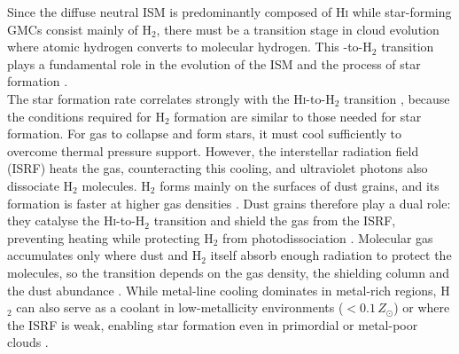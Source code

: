 Since the diffuse neutral ISM is predominantly composed of \textrm{H\textsc{i}} while star-forming GMCs consist mainly of H$_2$, there must be a transition stage in cloud evolution where atomic hydrogen converts to molecular hydrogen. This \HI-to-H$_2$ transition plays a fundamental role in the evolution of the ISM and the process of star formation \citep{Lee2012, Sternberg2014, Klessen2016}.\\\indent
The star formation rate correlates strongly with the \textrm{H\textsc{i}}-to-H$_2$ transition \citep{Krumholtz2011}, because the conditions required for H$_2$ formation are similar to those needed for star formation. For gas to collapse and form stars, it must cool sufficiently to overcome thermal pressure support. However, the interstellar radiation field (ISRF) heats the gas, counteracting this cooling, and ultraviolet photons also dissociate H$_2$ molecules. H$_2$ forms mainly on the surfaces of dust grains, and its formation is faster at higher gas densities \citep{GloverMacLow2007}. Dust grains therefore play a dual role: they catalyse the \textrm{H\textsc{i}}-to-H$_2$ transition and shield the gas from the ISRF, preventing heating while protecting H$_2$ from photodissociation \citep{Klessen2016}. Molecular gas accumulates only where dust and H$_2$ itself absorb enough radiation to protect the molecules, so the transition depends on the gas density, the shielding column and the dust abundance \citep{Krumholz2009Transition,Sternberg2014}. While metal-line cooling dominates in metal-rich regions, H$_2$ can also serve as a coolant in low-metallicity environments ($< 0.1\,Z_\odot$) or where the ISRF is weak, enabling star formation even in primordial or metal-poor clouds \citep{Glover2014}.

